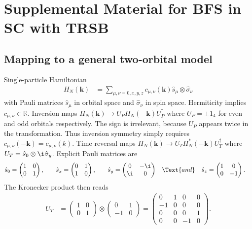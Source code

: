 \documentclass[english, parskip=full]{scrartcl}
\begin{document}


\section{Supplemental Material for BFS in SC with TRSB}
\subsection{Mapping to a general two-orbital model}
Single-particle Hamiltonian
\begin{align}
H_N(\textbf{k}) &= \sum_{\mu,\nu=0,x,y,z} c_{\mu,\nu}(\textbf{k}) \hat{s}_\mu \otimes \hat{\sigma}_\nu
\end{align}
with Pauli matrices $\hat{s}_\mu$ in orbital space and $\hat{\sigma}_\nu$ in spin space.
Hermiticity implies $c_{\mu,\nu} \in \mathbb{R}$.
Inversion maps $H_N(\textbf{k}) \rightarrow U_PH_N(-\textbf{k})U_P^\dagger$ where $U_P=\pm 1_4$ for even and odd orbitals respectively.
The sign is irrelevant, because $U_P$ appears twice in the transformation.
Thus inversion symmetry simply requires $c_{\mu,\nu}(-\textbf{k}) =  c_{\mu,\nu}(k)$.
Time reversal maps $H_N(\textbf{k}) \rightarrow U_T H_N^\ast(-\textbf{k})U_T^\dagger$ where $U_T= \hat{s}_0\otimes \i\hat{\sigma}_y$.
Explicit Pauli matrices are
\begin{align}
\hat{s}_0 &= \begin{pmatrix}
1 & 0 \\ 0 & 1
\end{pmatrix}, &&& \hat{s}_x &= \begin{pmatrix}
0 & 1 \\ 1 & 0
\end{pmatrix}, &&& \hat{s}_y &= \begin{pmatrix}
0 & -\i \\ \i & 0
\end{pmatrix} &&\Text{and}& \hat{s}_z &= \begin{pmatrix}
1 & 0 \\ 0 & -1
\end{pmatrix}.
\end{align}
The Kronecker product then reads
\begin{align}
U_T &= \begin{pmatrix}
1 & 0 \\ 0 & 1
\end{pmatrix} \otimes \begin{pmatrix}
0 & 1 \\ -1 & 0
\end{pmatrix} = \begin{pmatrix}
0 & 1 & 0 & 0 \\ -1 & 0 & 0 & 0 \\ 0&0&0 & 1 \\ 0&0&-1 & 0
\end{pmatrix}.
\end{align}
\end{document}
